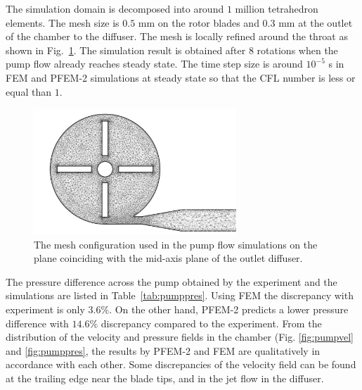 The simulation domain is decomposed into around $1$ million tetrahedron elements. The mesh size is $0.5$ mm on the rotor blades and $0.3$ mm at the outlet of the chamber to the diffuser. The mesh is locally refined around the throat as shown in Fig.~\ref{fig:pumpmesh}. The simulation result is obtained after $8$ rotations when the pump flow already reaches steady state. The time step size is around $10^{-5}$ s in FEM and PFEM-2 simulations at steady state so that the CFL number is less or equal than $1$.  
\begin{figure}[htbp]
    \centering
    \includegraphics[width=3in]{imgs/nozzle_pump/pump_mesh_2.pdf}
    \caption{The mesh configuration used in the pump flow simulations on the plane coinciding with the mid-axis plane of the outlet diffuser.}
    \label{fig:pumpmesh}
\end{figure}

The pressure difference across the pump obtained by the experiment and the simulations are listed in Table~\ref{tab:pumppres}. Using FEM the discrepancy with experiment is only $3.6$\%. On the other hand, PFEM-2 predicts a lower pressure difference with $14.6$\% discrepancy compared to the experiment. From the distribution of the velocity and pressure fields in the chamber (Fig. \ref{fig:pumpvel} and \ref{fig:pumppres}, the results by PFEM-2 and FEM are qualitatively in accordance with each other. Some discrepancies of the velocity field can be found at the trailing edge near the blade tips, and in the jet flow in the diffuser. 


